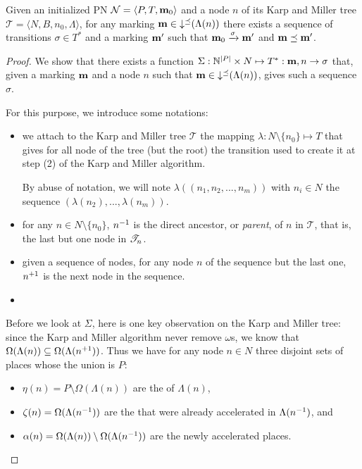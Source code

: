\begin{lemm}
  Given an initialized \ac{PN} $\mathcal{N} = \langle P,T, \mathbf{m}_0\rangle$ and a node $n$ of its Karp and Miller tree $\mathcal{T} = \langle N, B, n_0, \Lambda\rangle$,
  for any marking $\mathbf{m} \in \operatorname{\downarrow^\preceq}(\Lambda(n))$ there exists a sequence of transitions $\sigma \in T^*$ and a marking $\mathbf{m'}$ such that $\mathbf{m}_0 \xrightarrow{\sigma} \mathbf{m'}$ and $\mathbf{m} \preceq \mathbf{m'}$.
\end{lemm}
\begin{proof}
  We show that there exists a function $\Sigma : \mathbb{N}^{|P|} \times N \mapsto T^* : \mathbf{m}, n \rightarrow \sigma$ that, given a marking $\mathbf{m}$ and a node $n$ such that $\mathbf{m} \in \operatorname{\downarrow^\preceq}(\Lambda(n))$, gives such a sequence $\sigma$.

  For this purpose, we introduce some notations:
  \begin{itemize}
    \item we attach to the Karp and Miller tree $\mathcal{T}$ the mapping $\lambda : N \setminus \{n_0\} \mapsto T$ that gives for all node of the tree (but the root) the transition used to create it at step (2) of the Karp and Miller algorithm.

      By abuse of notation, we will note $\lambda((n_1, n_2, ..., n_m))$
      with  $n_i \in N$
      the sequence $(\lambda(n_2), ..., \lambda(n_m))$.
    \item for any $n \in N \setminus \{n_0\}$, $n^{-1}$ is the direct ancestor, or \emph{parent}, of $n$ in $\mathcal{T}$, that is, the last but one node in $\mathscr{T}_{n}$.
    \item given a sequence of nodes, for any node $n$ of the sequence but the last one, $n^{+1}$ is the next node in the sequence.
    \item {}
  \end{itemize}

  Before we look at $\Sigma$, here is one key observation on the Karp and Miller tree:
  since the Karp and Miller algorithm never remove $\omega$s, we know that $\Omega(\Lambda(n)) \subseteq \Omega(\Lambda(n^{+1}))$.
  Thus we have for any node $n \in N$ three disjoint sets of places whose the union is $P$:
  \begin{itemize}
    \item $\eta(n) = P \setminus \Omega(\Lambda(n))$ are the \noplaces of $\Lambda(n)$,
    \item $\zeta(n) = \Omega(\Lambda(n^{-1}))$ are the \oplaces that were already accelerated in $\Lambda(n^{-1})$, and
    \item $\alpha(n) = \Omega(\Lambda(n)) \setminus \Omega(\Lambda(n^{-1}))$ are the newly accelerated places.
  \end{itemize}



\end{proof}
